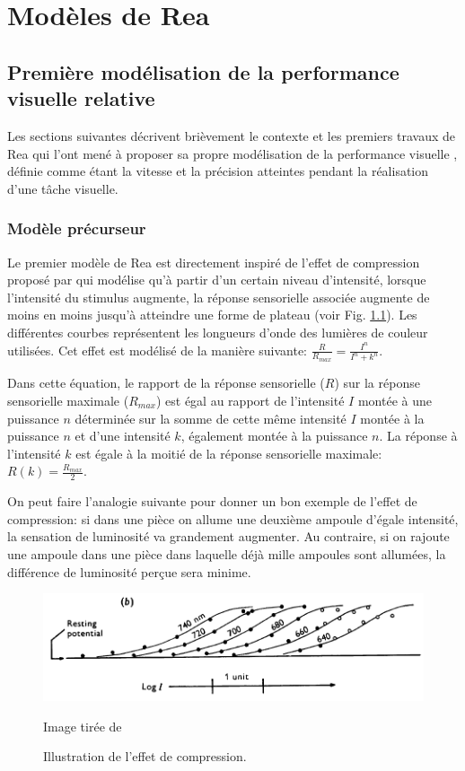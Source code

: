 \chapter{Modèles de Rea}
	\section{Première modélisation de la performance visuelle relative}
	\par Les sections suivantes décrivent brièvement le contexte et les premiers travaux de Rea qui l'ont mené à proposer sa propre modélisation de la performance visuelle \citep{rea_toward_1986, rea_toward_1987}, définie comme étant la vitesse et la précision atteintes pendant la réalisation d'une tâche visuelle.
	
	\subsection{Modèle précurseur}	
	\par Le premier modèle de Rea est directement inspiré de l'effet de compression proposé par \cite{naka_attempt_1966} qui modélise qu'à partir d'un certain niveau d'intensité, lorsque l'intensité du stimulus augmente, la réponse sensorielle associée augmente de moins en moins jusqu'à atteindre une forme de plateau (voir Fig. \ref{fig:compression_effect}). Les différentes courbes représentent les longueurs d'onde des lumières de couleur utilisées. Cet effet est modélisé de la manière suivante: $\frac{R}{R_{max}} = \frac{I^n}{I^n + k^n}$.
	
	\par Dans cette équation, le rapport de la réponse sensorielle ($R$) sur la réponse sensorielle maximale ($R_{max}$) est égal au rapport de l'intensité $I$ montée à une puissance $n$ déterminée sur la somme de cette même intensité $I$ montée à la puissance $n$ et d'une intensité $k$, également montée à la puissance $n$. La réponse à l'intensité $k$ est égale à la moitié de la réponse sensorielle maximale: $R(k) = \frac{R_{max}}{2}$.
	
	\par On peut faire l'analogie suivante pour donner un bon exemple de l'effet de compression: si dans une pièce on allume une deuxième ampoule d'égale intensité, la sensation de luminosité va grandement augmenter. Au contraire, si on rajoute une ampoule dans une pièce dans laquelle déjà mille ampoules sont allumées, la différence de luminosité perçue sera minime.	
	
	\begin{figure}
		\centering
		\includegraphics[scale=.6]{Figures/CompressionEffect}
		\caption{Illustration de l'effet de compression.}{Image tirée de \citep{naka_attempt_1966}}
		\label{fig:compression_effect}
	\end{figure} 
	
